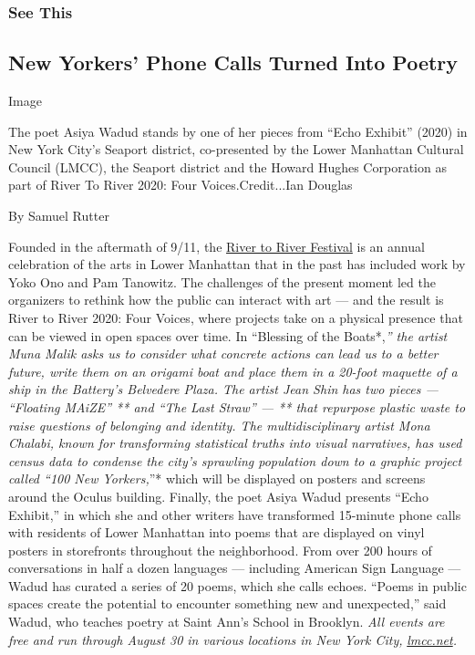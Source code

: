 \hypertarget{see-this}{%
\subsubsection{See This}\label{see-this}}

\hypertarget{new-yorkers-phone-calls-turned-into-poetry}{%
\subsection{New Yorkers' Phone Calls Turned Into
Poetry}\label{new-yorkers-phone-calls-turned-into-poetry}}

Image

The poet Asiya Wadud stands by one of her pieces from ``Echo Exhibit''
(2020) in New York City's Seaport district, co-presented by the Lower
Manhattan Cultural Council (LMCC), the Seaport district and the Howard
Hughes Corporation as part of River To River 2020: Four
Voices.Credit...Ian Douglas

By Samuel Rutter

Founded in the aftermath of 9/11, the
\href{https://www.nytimes.com/2019/06/26/arts/dance/river-to-river-festival.html}{River
to River Festival} is an annual celebration of the arts in Lower
Manhattan that in the past has included work by Yoko Ono and Pam
Tanowitz. The challenges of the present moment led the organizers to
rethink how the public can interact with art --- and the result is River
to River 2020: Four Voices, where projects take on a physical presence
that can be viewed in open spaces over time. In ``Blessing of the
Boats*,\emph{'' the artist Muna Malik asks us to consider what concrete
actions can lead us to a better future, write them on an origami boat
and place them in a 20-foot maquette of a ship in the Battery's
Belvedere Plaza. The artist Jean Shin has two pieces --- ``Floating
MAiZE'' ** and ``The Last Straw'' --- ** that repurpose plastic waste to
raise questions of belonging and identity. The multidisciplinary artist
Mona Chalabi, known for transforming statistical truths into visual
narratives, has used census data to condense the city's sprawling
population down to a graphic project called ``100 New Yorkers,}''* which
will be displayed on posters and screens around the Oculus building.
Finally, the poet Asiya Wadud presents ``Echo Exhibit,'' in which she
and other writers have transformed 15-minute phone calls with residents
of Lower Manhattan into poems that are displayed on vinyl posters in
storefronts throughout the neighborhood. From over 200 hours of
conversations in half a dozen languages --- including American Sign
Language --- Wadud has curated a series of 20 poems, which she calls
echoes. ``Poems in public spaces create the potential to encounter
something new and unexpected,'' said Wadud, who teaches poetry at Saint
Ann's School in Brooklyn. \emph{All events are free and run through
August 30 in various locations in New York City,}
\href{https://lmcc.net/river-to-river-festival/}{\emph{lmcc.net}}\emph{.}

